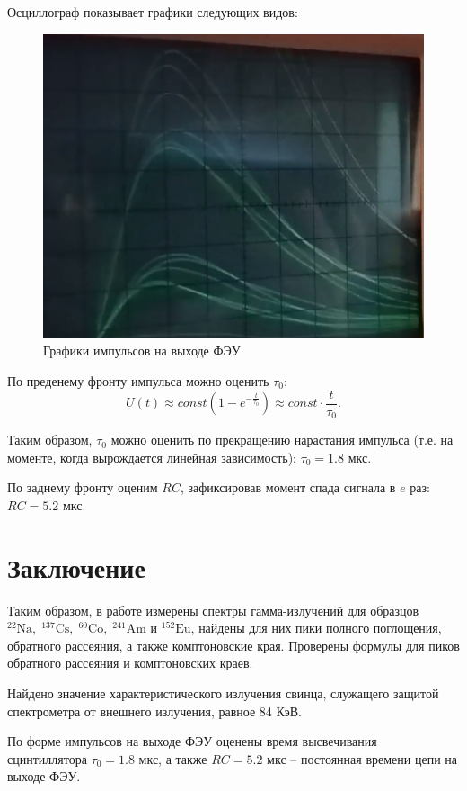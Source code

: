     Осциллограф показывает графики следующих видов:
    \begin{figure}[H]
        \centering
        \includegraphics[width = 13 cm]{images/RC}
        \caption{Графики импульсов на выходе ФЭУ}
        \label{RC}
    \end{figure}

    По преденему фронту импульса можно оценить $\tau_0$:
    \begin{equation}
        U(t) \approx const \left( 1 - e^{-\frac{t}{\tau_0}} \right) \approx const \cdot \frac{t}{\tau_0}.
    \end{equation}

    Таким образом, $\tau_0$ можно оценить по прекращению нарастания импульса (т.е. на моменте, когда вырождается линейная зависимость): $\tau_0 = 1.8$ мкс. 

    По заднему фронту оценим $RC$, зафиксировав момент спада сигнала в $e$ раз: $RC = 5.2$ мкс.
    
\section{Заключение}

    Таким образом, в работе измерены спектры гамма-излучений для образцов $\mathrm{^{22}Na, \; ^{137}Cs, \; ^{60}Co, \; ^{241}Am}$ и $\mathrm{^{152}Eu}$, найдены для них пики полного поглощения, обратного рассеяния, а также комптоновские края. Проверены формулы для пиков обратного рассеяния и комптоновских краев.

    Найдено значение характеристического излучения свинца, служащего защитой спектрометра от внешнего излучения, равное 84 КэВ.

    По форме импульсов на выходе ФЭУ оценены время высвечивания сцинтиллятора $\tau_0 = 1.8$ мкс, а также $RC = 5.2$ мкс -- постоянная времени цепи на выходе ФЭУ.
